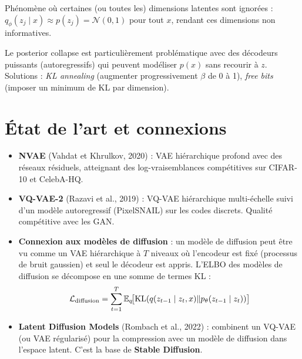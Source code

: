 \begin{definition}
Ph\'enom\`ene o\`u certaines (ou toutes les) dimensions latentes sont ignor\'ees : $q_\phi(z_j \mid x) \approx p(z_j) = \mathcal{N}(0, 1)$ pour tout $x$, rendant ces dimensions non informatives.
\end{definition}

\begin{attention}
Le posterior collapse est particuli\`erement probl\'ematique avec des d\'ecodeurs puissants (autoregressifs) qui peuvent mod\'eliser $p(x)$ sans recourir \`a $z$. Solutions : \emph{KL annealing} (augmenter progressivement $\beta$ de 0 \`a 1), \emph{free bits} (imposer un minimum de KL par dimension).
\end{attention}

\section{\'Etat de l'art et connexions}
\label{sec:vae-sota}

\begin{sota}[title=\textbf{Extensions et successeurs des VAE}]
\begin{itemize}
    \item \textbf{NVAE} (Vahdat et Khrulkov, 2020) : VAE hi\'erarchique profond avec des r\'eseaux r\'esiduels, atteignant des log-vraisemblances comp\'etitives sur CIFAR-10 et CelebA-HQ.

    \item \textbf{VQ-VAE-2} (Razavi et al., 2019) : VQ-VAE hi\'erarchique multi-\'echelle suivi d'un mod\`ele autoregressif (PixelSNAIL) sur les codes discrets. Qualit\'e comp\'etitive avec les GAN.

    \item \textbf{Connexion aux mod\`eles de diffusion} : un mod\`ele de diffusion peut \^etre vu comme un VAE hi\'erarchique \`a $T$ niveaux o\`u l'encodeur est fix\'e (processus de bruit gaussien) et seul le d\'ecodeur est appris. L'ELBO des mod\`eles de diffusion se d\'ecompose en une somme de termes KL :
    \begin{equation}
    \mathcal{L}_{\text{diffusion}} = \sum_{t=1}^{T} \mathbb{E}_q\!\big[\mathrm{KL}(q(z_{t-1} \mid z_t, x) \| p_\theta(z_{t-1} \mid z_t))\big]
    \end{equation}

    \item \textbf{Latent Diffusion Models} (Rombach et al., 2022) : combinent un VQ-VAE (ou VAE r\'egularis\'e) pour la compression avec un mod\`ele de diffusion dans l'espace latent. C'est la base de \textbf{Stable Diffusion}.
\end{itemize}
\end{sota}

